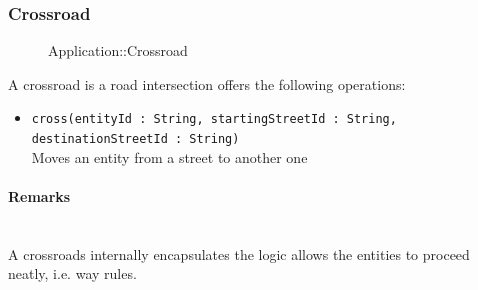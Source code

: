 \subsubsection{Crossroad}
\begin{figure}[h]
\centering
{}
\caption{Application::Crossroad}
\end{figure}
\FloatBarrier
A crossroad is a road intersection offers the following operations:
\begin{itemize}
	\item \texttt{cross(entityId : String, startingStreetId : String, destinationStreetId : String)}
	\\Moves an entity from a street to another one
\end{itemize}
\paragraph{Remarks}
\ \\A crossroads internally encapsulates the logic allows the entities to proceed neatly, i.e. way rules.
